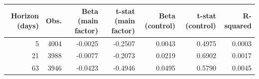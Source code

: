 \begin{tabular}{rrrrrrr}
\toprule
Horizon (days) & Obs. & Beta (main factor) & t-stat (main factor) & Beta (control) & t-stat (control) & R-squared \\
\midrule
5 & 4004 & -0.0025 & -0.2507 & 0.0043 & 0.4975 & 0.0003 \\
21 & 3988 & -0.0077 & -0.2073 & 0.0219 & 0.6902 & 0.0017 \\
63 & 3946 & -0.0423 & -0.4946 & 0.0495 & 0.5790 & 0.0045 \\
\bottomrule
\end{tabular}
